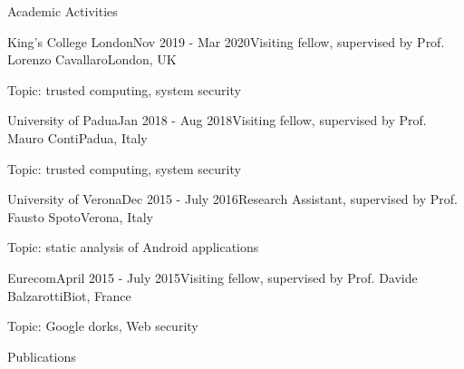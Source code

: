 \documentclass{resume} %
\begin{document}
\begin{rSection}{Academic Activities}

\begin{rSubsection}{King's College London}{Nov 2019 - Mar 2020}{Visiting 
fellow, supervised by Prof. Lorenzo Cavallaro}{London, UK}
	\item Topic: trusted computing, system security
\end{rSubsection}

\begin{rSubsection}{University of Padua}{Jan 2018 - Aug 2018}{Visiting fellow, supervised by Prof. Mauro Conti}{Padua, Italy}
    \item Topic: trusted computing, system security
\end{rSubsection}


\begin{rSubsection}{University of Verona}{Dec 2015 - July 2016}{Research Assistant, supervised by Prof. Fausto Spoto}{Verona, Italy}
\item Topic: static analysis of Android applications
\end{rSubsection}

\begin{rSubsection}{Eurecom}{April 2015 - July 2015}{Visiting fellow, supervised by Prof. Davide Balzarotti}{Biot, France}
\item Topic: Google dorks, Web security
\end{rSubsection}

\end{rSection}
\newpage
\begin{rSection}{Publications}





    
\end{rSection}
\end{document}
